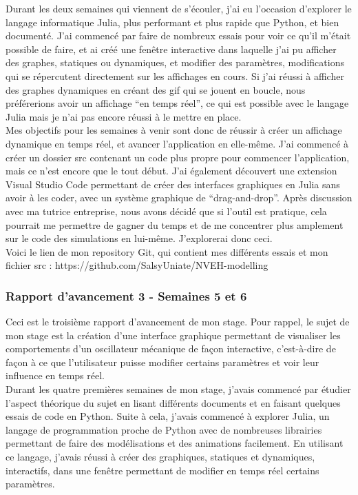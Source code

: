 \documentclass[a4paper, french, 12pt, titlepage]{article}
\begin{document}
Durant les deux semaines qui viennent de s'écouler, j'ai eu l'occasion d'explorer le langage informatique Julia, plus performant et plus rapide que Python, et bien documenté. J'ai commencé par faire de nombreux essais pour voir ce qu'il m'était possible de faire, et ai créé une fenêtre interactive dans laquelle j'ai pu afficher des graphes, statiques ou dynamiques, et modifier des paramètres, modifications qui se répercutent directement sur les affichages en cours. Si j'ai réussi à afficher des graphes dynamiques en créant des gif qui se jouent en boucle, nous préférerions avoir un affichage “en temps réel”, ce qui est possible avec le langage Julia mais je n'ai pas encore réussi à le mettre en place. \\

Mes objectifs pour les semaines à venir sont donc de réussir à créer un affichage dynamique en temps réel, et avancer l'application en elle-même. J'ai commencé à créer un dossier src contenant un code plus propre pour commencer l'application, mais ce n'est encore que le tout début. J'ai également découvert une extension Visual Studio Code permettant de créer des interfaces graphiques en Julia sans avoir à les coder, avec un système graphique de “drag-and-drop”. Après discussion avec ma tutrice entreprise, nous avons décidé que si l'outil est pratique, cela pourrait me permettre de gagner du temps et de me concentrer plus amplement sur le code des simulations en lui-même. J'explorerai donc ceci. \\

Voici le lien de mon repository Git, qui contient mes différents essais et mon fichier src : https://github.com/SalsyUniate/NVEH-modelling



\subsubsection*{Rapport d'avancement 3 - Semaines 5 et 6}

Ceci est le troisième rapport d'avancement de mon stage. Pour rappel, le sujet de mon stage est la création d'une interface graphique permettant de visualiser les comportements d'un oscillateur mécanique de façon interactive, c'est-à-dire de façon à ce que l'utilisateur puisse modifier certains paramètres et voir leur influence en temps réel. \\

Durant les quatre premières semaines de mon stage, j'avais commencé par étudier l'aspect théorique du sujet en lisant différents documents et en faisant quelques essais de code en Python. Suite à cela, j'avais commencé à explorer Julia, un langage de programmation proche de Python avec de nombreuses librairies permettant de faire des modélisations et des animations facilement. En utilisant ce langage, j'avais réussi à créer des graphiques, statiques et dynamiques, interactifs, dans une fenêtre permettant de modifier en temps réel certains paramètres. \\
\end{document}
